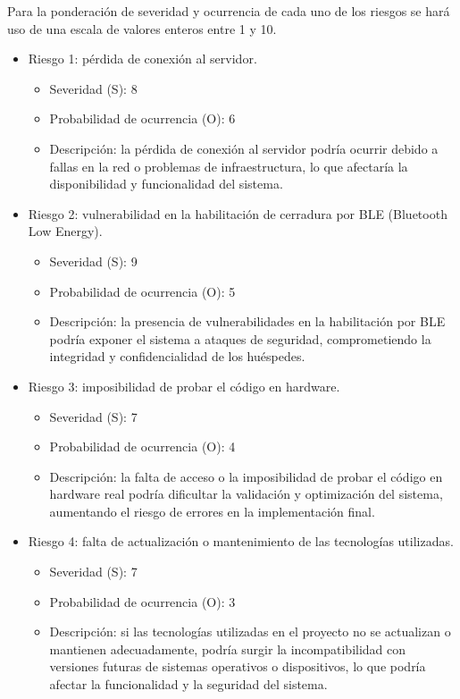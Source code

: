 \documentclass[
11pt, %
codirector, %
]{charter}
\begin{document}
Para la ponderación de severidad y ocurrencia de cada uno de los riesgos se hará uso de una escala de valores enteros entre 1 y 10.

\begin{itemize}
    \item Riesgo 1: pérdida de conexión al servidor.
    \begin{itemize}
        \item Severidad (S): 8
        \item Probabilidad de ocurrencia (O): 6
        \item Descripción: la pérdida de conexión al servidor podría ocurrir debido a fallas en la red o problemas de infraestructura, lo que afectaría la disponibilidad y funcionalidad del sistema.
    \end{itemize}
    
    \item Riesgo 2: vulnerabilidad en la habilitación de cerradura por BLE (Bluetooth Low Energy).
    \begin{itemize}
        \item Severidad (S): 9
        \item Probabilidad de ocurrencia (O): 5
        \item Descripción: la presencia de vulnerabilidades en la habilitación por BLE podría exponer el sistema a ataques de seguridad, comprometiendo la integridad y confidencialidad de los huéspedes.
    \end{itemize}
    
    \item Riesgo 3: imposibilidad de probar el código en hardware.
    \begin{itemize}
        \item Severidad (S): 7
        \item Probabilidad de ocurrencia (O): 4
        \item Descripción: la falta de acceso o la imposibilidad de probar el código en hardware real podría dificultar la validación y optimización del sistema, aumentando el riesgo de errores en la implementación final.
    \end{itemize}
    
    \item Riesgo 4: falta de actualización o mantenimiento de las tecnologías utilizadas.
    \begin{itemize}
        \item Severidad (S): 7
        \item Probabilidad de ocurrencia (O): 3
        \item Descripción: si las tecnologías utilizadas en el proyecto no se actualizan o mantienen adecuadamente, podría surgir la incompatibilidad con versiones futuras de sistemas operativos o dispositivos, lo que podría afectar la funcionalidad y la seguridad del sistema.
    \end{itemize}
    

\end{itemize}
\end{document}
